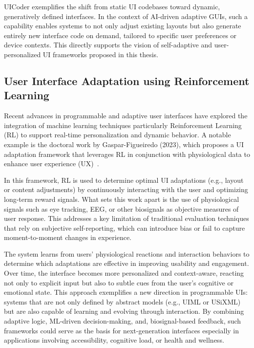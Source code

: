 \documentclass[openany]{book}
\begin{document}
UICoder exemplifies the shift from static UI codebases toward dynamic, generatively defined interfaces. In the context of AI-driven adaptive GUIs, such a capability enables systems to not only adjust existing layouts but also generate entirely new interface code on demand, tailored to specific user preferences or device contexts. This directly supports the vision of self-adaptive and user-personalized UI frameworks proposed in this thesis.

\subsection{User Interface Adaptation using
Reinforcement Learning}
Recent advances in programmable and adaptive user interfaces have explored the integration of machine learning techniques particularly Reinforcement Learning (RL) to support real-time personalization and dynamic behavior. A notable example is the doctoral work by Gaspar-Figueiredo (2023), which proposes a UI adaptation framework that leverages RL in conjunction with physiological data to enhance user experience (UX)~\cite{gaspar2023learning}.

In this framework, RL is used to determine optimal UI adaptations (e.g., layout or content adjustments) by continuously interacting with the user and optimizing long-term reward signals. What sets this work apart is the use of physiological signals such as eye tracking, EEG, or other biosignals as objective measures of user response. This addresses a key limitation of traditional evaluation techniques that rely on subjective self-reporting, which can introduce bias or fail to capture moment-to-moment changes in experience.

The system learns from users' physiological reactions and interaction behaviors to determine which adaptations are effective in improving usability and engagement. Over time, the interface becomes more personalized and context-aware, reacting not only to explicit input but also to subtle cues from the user’s cognitive or emotional state.
This approach exemplifies a new direction in programmable UIs: systems that are not only defined by abstract models (e.g., UIML or USiXML) but are also capable of learning and evolving through interaction. By combining adaptive logic, ML-driven decision-making, and, biosignal-based feedback, such frameworks could serve as the basis for next-generation interfaces especially in applications involving accessibility, cognitive load, or health and wellness.
\end{document}
